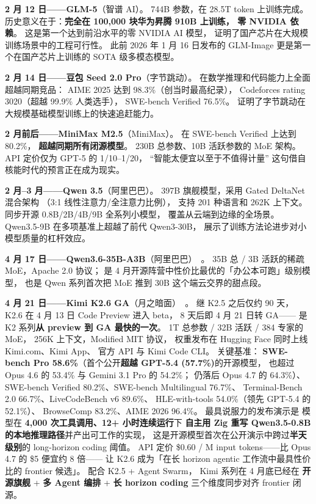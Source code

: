 \textbf{2 月 12 日——GLM-5}（智谱 AI）。
744B 参数，在 28.5T token 上训练完成。
历史意义在于：\textbf{完全在 100,000 块华为昇腾 910B 上训练，
零 NVIDIA 依赖}。
这是第一个达到前沿水平的零 NVIDIA AI 模型，
证明了国产芯片在大规模训练场景中的工程可行性。
此前 2026 年 1 月 16 日发布的 GLM-Image
更是第一个在国产芯片上训练的 SOTA 级多模态模型。

\textbf{2 月 14 日——豆包 Seed 2.0 Pro}（字节跳动）。
在数学推理和代码能力上全面超越同期竞品：
AIME 2025 达到 98.3\%（创当时最高纪录），
Codeforces rating 3020（超越 99.9\% 人类选手），
SWE-bench Verified 76.5\%。
证明了字节跳动在大规模基础模型训练上的快速追赶能力。

\textbf{2 月前后——MiniMax M2.5}（MiniMax）。
在 SWE-bench Verified 上达到 80.2\%，
\textbf{超越同期所有闭源模型}。
230B 总参数、10B 活跃参数的 MoE 架构。
API 定价仅为 GPT-5 的 1/10--1/20，
“智能太便宜以至于不值得计量”
这句借自核能时代的预言正在成为现实。

\textbf{2 月--3 月——Qwen 3.5}（阿里巴巴）。
397B 旗舰模型，采用 Gated DeltaNet 混合架构
（3:1 线性注意力/全注意力比例），
支持 201 种语言和 262K 上下文。
同步开源 0.8B/2B/4B/9B 全系列小模型，
覆盖从云端到边缘的全场景。
Qwen3.5-9B 在多项基准上超越了前代 Qwen3-30B，
展示了训练方法论进步对小模型质量的杠杆效应。

\textbf{4 月 17 日——Qwen3.6-35B-A3B}（阿里巴巴）~\cite{qwen36moe}。
35B 总 / 3B 活跃的稀疏 MoE，Apache 2.0 协议；
是 4 月开源阵营中性价比最优的「办公本可跑」级别模型，
也是 Qwen 系列首次把 MoE 推到 30B 这个端云交界的甜点段。

\textbf{4 月 21 日——Kimi K2.6 GA}（月之暗面）~\cite{moonshotk26}。
继 K2.5 之后仅约 90 天，
K2.6 在 4 月 13 日 Code Preview 进入 beta，
8 天后即 4 月 21 日转 GA——
是 K2 系列\textbf{从 preview 到 GA 最快的一次}。
1T 总参数 / 32B 活跃 / 384 专家的 MoE，
256K 上下文，Modified MIT 协议，
权重发布在 Hugging Face 同时上线 Kimi.com、Kimi App、
官方 API 与 Kimi Code CLI。
关键基准：
\textbf{SWE-bench Pro 58.6\%}（首个公开\textbf{超越 GPT-5.4 (57.7\%)}的开源模型，
也超过 Opus 4.6 的 53.4\% 与 Gemini 3.1 Pro 的 54.2\%；
仍落后 Opus 4.7 的 64.3\%）、
SWE-bench Verified 80.2\%、SWE-bench Multilingual 76.7\%、
Terminal-Bench 2.0 66.7\%、LiveCodeBench v6 89.6\%、
HLE-with-tools 54.0\%（领先 GPT-5.4 的 52.1\%）、
BrowseComp 83.2\%、AIME 2026 96.4\%。
最具说服力的发布演示是
模型在 \textbf{4{,}000 次工具调用、12+ 小时连续运行}下
\textbf{自主用 Zig 重写 Qwen3.5-0.8B 的本地推理路径}并产出可工作的实现，
这是开源模型首次在公开演示中跨过\textbf{半天级别}的 long-horizon coding 阈值。
API 定价 \$0.60 / M input tokens——比 Opus 4.7 的 \$5 便宜约 8 倍——
让 K2.6 成为「在长 horizon agentic 工作流中最具性价比的 frontier 候选」。
配合 K2.5 + Agent Swarm，
Kimi 系列在 4 月底已经在
\textbf{开源旗舰} + \textbf{多 Agent 编排} + \textbf{长 horizon coding}
三个维度同步对齐 frontier 闭源。

